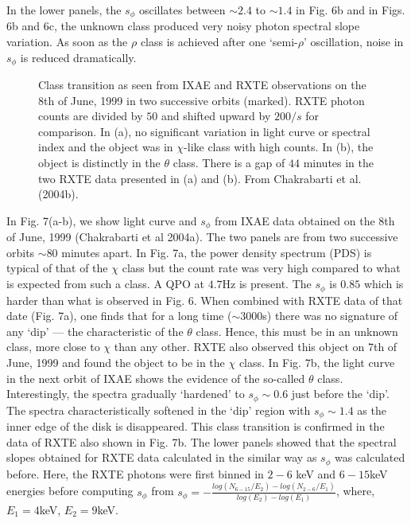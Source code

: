 \documentclass[referee]{cjaa}           %
\begin{document}
In the lower panels, the $s_\phi$ oscillates between $\sim 2.4$ 
to $\sim 1.4$ in Fig. 6b and in Figs. 6b and 6c, the unknown class
produced very noisy photon spectral slope variation. As soon as the $\rho$
class is achieved after one `semi-$\rho$' oscillation, noise in $s_\phi$ is
reduced dramatically.

\begin{figure}
\vskip -5.0cm
\hspace {2.0cm}
   \mbox{\textwidth{}\textwidth{}}
   \begin{center}
\vskip -2.5cm
   \caption{Class transition as seen from IXAE and
RXTE observations on the 8th of June, 1999 in two successive orbits (marked). RXTE photon counts are divided
by $50$ and shifted upward by $200/s$ for comparison. In (a), 
no significant variation in light curve or spectral index and the object was in $\chi$-like class with high counts.
In (b), the object is distinctly in the $\theta$ class. There is a gap of $44$ minutes in the 
two RXTE data presented in (a) and (b). From Chakrabarti et al. (2004b).} 
   \end{center}
\end{figure}

In Fig. 7(a-b), we show light curve and $s_\phi$ from IXAE data obtained on the 8th of June, 1999 
(Chakrabarti et al 2004a).
The two panels are from two successive orbits $\sim 80$ minutes apart. In Fig. 7a, 
the power density spectrum (PDS) is typical of that of the $\chi$ class but the count rate was very 
high compared to what is expected from such a class. A QPO at $4.7$Hz is present.
The $s_\phi$ is $0.85$  which is harder than what is observed in Fig. 6. When combined with RXTE data of that
date (Fig. 7a), one finds that for a long time ($\sim 3000$s) there was no signature of any `dip' --- 
the characteristic of the $\theta$ class.  Hence, this must be in an unknown class, more close to $\chi$
than any other. RXTE also observed this object on 7th of June, 1999 and found the
object to be in the $\chi$ class. In Fig. 7b, the light curve in the next orbit of IXAE
shows the evidence of the so-called $\theta$ class. Interestingly, the spectra gradually `hardened'
to $s_\phi \sim 0.6$ just before the `dip'. The spectra characteristically softened
in the `dip' region with $s_\phi \sim 1.4$ as the inner edge of the disk is
disappeared. This class transition is confirmed in the data of RXTE also shown
in Fig. 7b. The lower panels showed that the spectral slopes obtained for RXTE
data calculated in the similar way as $s_\phi$ was calculated before.
Here, the RXTE photons were first binned in $2-6$ keV and $6-15$keV energies before computing $s_\phi$ from
$s_\phi= - \frac{log(N_{6-15}/E_2) - log(N_{2-6}/E_1)}{log(E_2)-log(E_1)}$,
where, $E_1=4$keV, $E_2=9$keV. 
\end{document}
